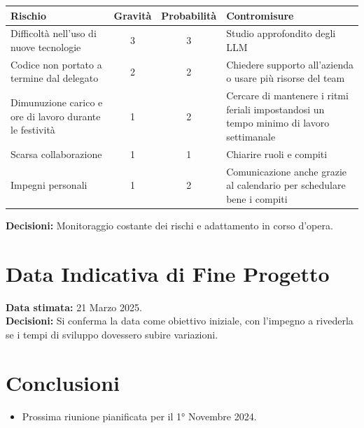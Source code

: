 \documentclass{article}
\begin{document}
\begin{table}[h]
\centering
\begin{tabularx}{\textwidth}{|X|c|c|X|}
    \hline
    \textbf{Rischio} & \textbf{Gravità} & \textbf{Probabilità}& \textbf{Contromisure}\\
    \hline
    Difficoltà nell'uso di nuove tecnologie & 3& 3 & Studio approfondito degli LLM \\ 
    \hline
    Codice non portato a termine dal delegato & 2 & 2 & Chiedere supporto all'azienda o usare più risorse del team\\ 
    \hline
    Dimunuzione carico e ore di lavoro durante le festività & 1 & 2 & Cercare di mantenere i ritmi feriali impostandosi un tempo minimo di lavoro settimanale\\ 
    \hline 
    Scarsa collaborazione & 1& 1 & Chiarire ruoli e compiti \\ 
    \hline
    Impegni personali & 1 & 2 & Comunicazione anche grazie al calendario per schedulare bene i compiti\\ 
    \hline 
\end{tabularx}
\end{table}
\textbf{Decisioni:} Monitoraggio costante dei rischi e adattamento in corso d’opera.

\section{Data Indicativa di Fine Progetto}
\textbf{Data stimata:} 21 Marzo 2025. \\
\textbf{Decisioni:} Si conferma la data come obiettivo iniziale, con l’impegno a rivederla se i tempi di sviluppo dovessero subire variazioni.

\section*{Conclusioni}
\begin{itemize}
    \item Prossima riunione pianificata per il 1° Novembre 2024.
\end{itemize}
\end{document}
